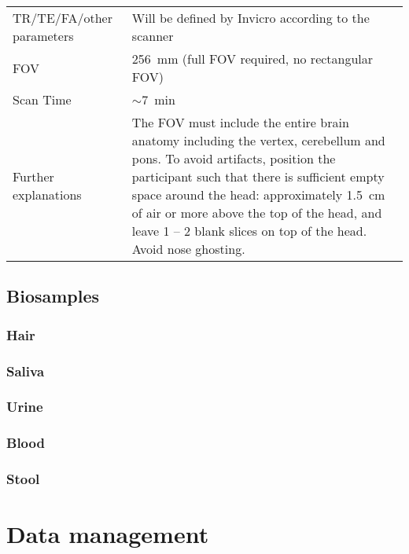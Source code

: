 \begin{tabularx}{\linewidth}{@{} s | X @{}}
TR/TE/FA/other parameters 					& Will be defined by Invicro according to the scanner                  \\
\ac{FOV}                       							& \SI{256}{\milli\metre} (full \ac{FOV} required, no rectangular \ac{FOV})	\\
Scan Time                 								& $\sim$\SI{7}{\minute}									\\
Further explanations      						&  The FOV must include the entire brain anatomy including the vertex, cerebellum and pons. To avoid artifacts, position the participant such that there is sufficient empty space around the head: approximately \SI{1.5}{\centi\metre} of air or more above the top of the head, and leave 1 -- 2 blank slices on top of the head. Avoid nose ghosting.                                                                                        
\end{tabularx}


\subsection{Biosamples}
\subsubsection{Hair}
\subsubsection{Saliva}
\subsubsection{Urine}
\subsubsection{Blood}
\subsubsection{Stool}

\section{Data management}

